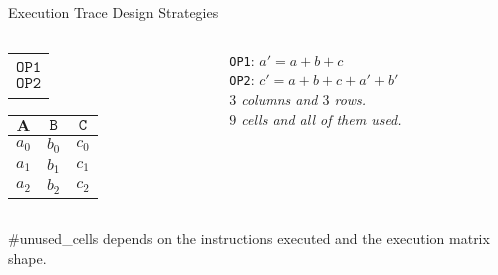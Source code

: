 \begin{frame}[allowframebreaks]{Execution Trace Design Strategies}
\begin{columns}
\begin{column}{0.48\textwidth}
\vspace{0.2cm}
\begin{table}[h!]
\begin{tabular}{c}
$             $ \\
$\mathtt{OP1}$ \\
$\mathtt{OP2}$ \\
$             $
\end{tabular}
\begin{tabular}{|c|c|c|}\hline
$\mathbf{A}$ & $\mathtt{B}$ & $\mathtt{C}$ \\ \hline
$a_0$ & $b_0$ & $c_0$ \\ \hline
$a_1$ & $b_1$ & $c_1$ \\ \hline
$a_2$ & $b_2$ & \cellcolor{green}$c_2$ \\ \hline
\end{tabular}
\end{table}
\end{column}
\begin{column}{0.48\textwidth}
\texttt{OP1}: $a'=a+b+c$
\\ \texttt{OP2}: $c'=a+b+c+a'+b'$
\\ \textit{$3$ columns and $3$ rows.}
\\ \textit{$9$ cells and all of them used. }
\end{column}
\end{columns}
\#unused\_cells depends on the instructions executed and the execution matrix shape.
\end{frame}






